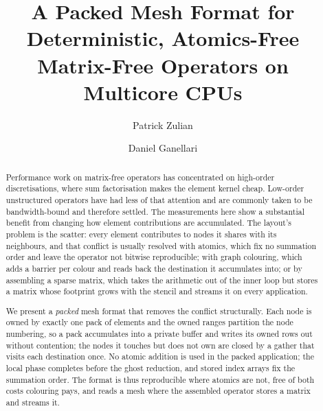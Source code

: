 \documentclass[sigconf,nonacm]{acmart}
\begin{document}
\title{A Packed Mesh Format for Deterministic, Atomics-Free Matrix-Free
       Operators on Multicore CPUs}

\author{Patrick Zulian}

\author{Daniel Ganellari}

\begin{abstract}
Performance work on matrix-free operators has concentrated on high-order discretisations, where
sum factorisation makes the element kernel cheap. Low-order unstructured operators have had less
of that attention and are commonly taken to be bandwidth-bound and therefore settled. The
measurements here show a substantial benefit from changing how element contributions
are accumulated. The layout's problem is the scatter: every element
contributes to nodes it shares with its neighbours, and that conflict is usually resolved with
atomics, which fix no summation order and leave the operator not bitwise reproducible; with
graph colouring, which adds a barrier per colour and reads back the destination it accumulates
into; or by assembling a sparse matrix, which takes the arithmetic out of the inner loop but
stores a matrix whose footprint grows with the stencil and streams it on every application.

We present a \emph{packed} mesh format that removes the conflict structurally. Each node is
owned by exactly one pack of elements and the owned ranges partition the node numbering, so a
pack accumulates into a private buffer and writes its owned rows out without contention; the
nodes it touches but does not own are closed by a gather that visits each destination once. No
atomic addition is used in the packed application; the local phase completes before the
ghost reduction, and stored index arrays fix the summation order. The format is thus reproducible where atomics
are not, free of both costs colouring pays, and reads a mesh where the assembled operator stores
a matrix and streams it.


\end{abstract}
\end{document}
